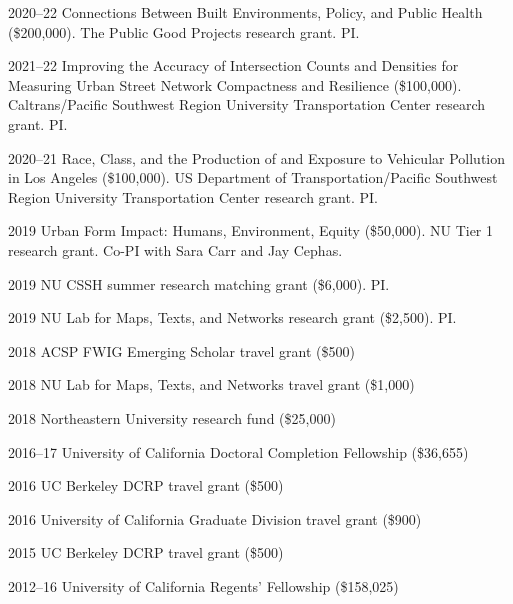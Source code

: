 \documentclass[12pt,letterpaper]{report}
\begin{document}
    \begin{tablist}

        \item[2020--22] \tab{}Connections Between Built Environments, Policy, and Public Health (\$200,000). The Public Good Projects research grant. PI.\@

        \item[2021--22] \tab{}Improving the Accuracy of Intersection Counts and Densities for Measuring Urban Street Network Compactness and Resilience (\$100,000). Caltrans/Pacific Southwest Region University Transportation Center research grant. PI.\@

        \item[2020--21] \tab{}Race, Class, and the Production of and Exposure to Vehicular Pollution in Los Angeles (\$100,000). US Department of Transportation/Pacific Southwest Region University Transportation Center research grant. PI.\@

        \item[2019] \tab{}Urban Form Impact: Humans, Environment, Equity (\$50,000). NU Tier 1 research grant. Co-PI with Sara Carr and Jay Cephas.

        \item[2019] \tab{}NU CSSH summer research matching grant (\$6,000). PI.\@

        \item[2019] \tab{}NU Lab for Maps, Texts, and Networks research grant (\$2,500). PI.\@

        \item[2018] \tab{}ACSP FWIG Emerging Scholar travel grant (\$500)

        \item[2018] \tab{}NU Lab for Maps, Texts, and Networks travel grant (\$1,000)

        \item[2018] \tab{}Northeastern University research fund (\$25,000)

        \item[2016--17] \tab{}University of California Doctoral Completion Fellowship (\$36,655)

        \item[2016] \tab{}UC Berkeley DCRP travel grant (\$500)

        \item[2016] \tab{}University of California Graduate Division travel grant (\$900)

        \item[2015] \tab{}UC Berkeley DCRP travel grant (\$500)

        \item[2012--16] \tab{}University of California Regents' Fellowship (\$158,025)

    \end{tablist}
\end{document}
